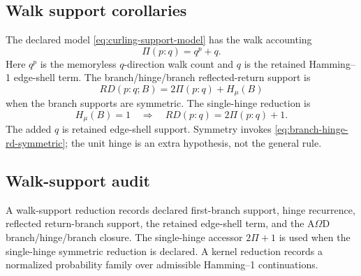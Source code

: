 \subsection{Walk support corollaries}\label{app:rd-tests:corollaries}
The declared model \eqref{eq:curling-support-model} has the walk accounting
\begin{equation}
\Pi(p{:}q)=q^p+q.
\label{app:rd:eq:path-support}
\end{equation}
Here \(q^p\) is the memoryless \(q\)-direction walk count and \(q\) is the retained Hamming--1 edge-shell term. The branch/hinge/branch reflected-return support is
\begin{equation}
RD(p{:}q;B)=2\Pi(p{:}q)+H_\mu(B)
\label{app:rd:eq:reflected-return}
\end{equation}
when the branch supports are symmetric. The single-hinge reduction is
\begin{equation}
H_\mu(B)=1
\quad\Longrightarrow\quad
RD(p{:}q)=2\Pi(p{:}q)+1.
\label{app:rd:eq:single-hinge-return}
\end{equation}
The added \(q\) is retained edge-shell support. Symmetry invokes
\eqref{eq:branch-hinge-rd-symmetric}; the unit hinge is an extra hypothesis,
not the general rule.



\subsection{Walk-support audit}\label{app:rd-tests:audit}
A walk-support reduction records declared first-branch support, hinge recurrence, reflected return-branch support, the retained edge-shell term, and the A\(\Omega\)D branch/hinge/branch closure. The single-hinge accessor \(2\Pi+1\) is used when the single-hinge symmetric reduction is declared. A kernel reduction records a normalized probability family over admissible Hamming--1 continuations.

